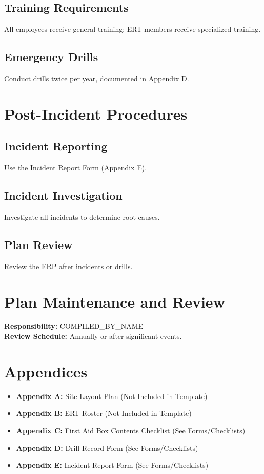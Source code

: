 \documentclass[12pt]{article}
\begin{document}
\subsection{Training Requirements}
All employees receive general training; ERT members receive specialized training.

\subsection{Emergency Drills}
Conduct drills twice per year, documented in Appendix D.

\section{Post-Incident Procedures}

\subsection{Incident Reporting}
Use the Incident Report Form (Appendix E).

\subsection{Incident Investigation}
Investigate all incidents to determine root causes.

\subsection{Plan Review}
Review the ERP after incidents or drills.

\section{Plan Maintenance and Review}
\textbf{Responsibility:} {{COMPILED_BY_NAME}}\\
\textbf{Review Schedule:} Annually or after significant events.

\section{Appendices}
\begin{itemize}
    \item \textbf{Appendix A:} Site Layout Plan (Not Included in Template)
    \item \textbf{Appendix B:} ERT Roster (Not Included in Template)
    \item \textbf{Appendix C:} First Aid Box Contents Checklist (See Forms/Checklists)
    \item \textbf{Appendix D:} Drill Record Form (See Forms/Checklists)
    \item \textbf{Appendix E:} Incident Report Form (See Forms/Checklists)
\end{itemize}
\end{document}
